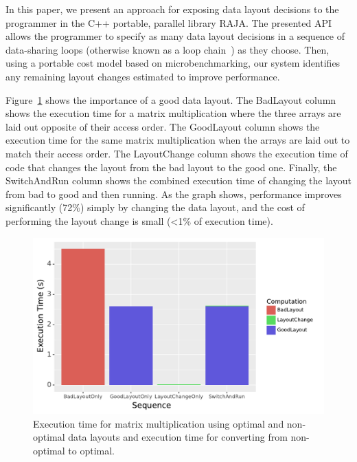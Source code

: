 \documentclass[sigconf]{acmart}
\begin{document}
In this paper, we present an approach for exposing data layout decisions to the programmer in the C++ portable, parallel library RAJA.
The presented API allows the programmer to specify as many data layout decisions in a sequence of data-sharing loops (otherwise known as a loop chain~\cite{krieger2013loop}) as they choose.
Then, using a portable cost model based on microbenchmarking, our system identifies any remaining layout changes estimated to improve performance.  


Figure~\ref{IntroExample} shows the importance of a good data layout. 
The BadLayout column shows the execution time for a matrix multiplication where the three arrays are laid out opposite of their access order. 
The GoodLayout column shows the execution time for the same matrix multiplication when the arrays are laid out to match their access order.
The LayoutChange column shows the execution time of code that changes the layout from the bad layout to the good one.
Finally, the SwitchAndRun column shows the combined execution time of changing the layout from bad to good and then running.
As the graph shows, performance improves  significantly (72\%) simply by changing the data layout, and the cost of performing the layout change is small (<1\% of execution time). 

\begin{figure}
	\includegraphics[width=\columnwidth]{IntroExampleGraph.pdf}
	\caption{Execution time for matrix multiplication using optimal and non-optimal data layouts and execution time for converting from non-optimal to optimal.}
	\label{IntroExample}
\end{figure}
\end{document}
